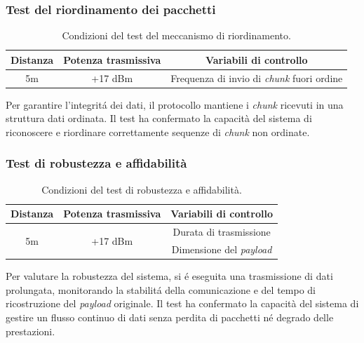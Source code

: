 \documentclass[12pt,a4paper,twoside]{book}
\begin{document}
\subsubsection{Test del riordinamento dei pacchetti}
\begin{table}[H]
    \centering
    \begin{tabular}{|c|c|c|}
        \hline
        \textbf{Distanza} & \textbf{Potenza trasmissiva} & \textbf{Variabili di controllo}                 \\ \hline
        5m                & +17 dBm                      & Frequenza di invio di \emph{chunk} fuori ordine \\ \hline
    \end{tabular}
    \caption{Condizioni del test del meccanismo di riordinamento.}
    \label{tab:T4-conditions}
\end{table}
Per garantire l'integrit\'a dei dati, il protocollo mantiene i \emph{chunk} ricevuti
in una struttura dati ordinata.
Il test ha confermato la capacità del sistema di riconoscere e riordinare
correttamente sequenze di \emph{chunk} non ordinate.

\subsubsection{Test di robustezza e affidabilità}
\begin{table}[H]
    \centering
    \begin{tabular}{|c|c|c|}
        \hline
        \textbf{Distanza}   & \textbf{Potenza trasmissiva} & \textbf{Variabili di controllo} \\ \hline
        \multirow{2}{*}{5m} & \multirow{2}{*}{+17 dBm}     & Durata di trasmissione          \\ \cline{3-3}
                            &                              & Dimensione del \emph{payload}   \\ \hline
    \end{tabular}
    \caption{Condizioni del test di robustezza e affidabilità.}
    \label{tab:T5-conditions}
\end{table}
Per valutare la robustezza del sistema, si \'e eseguita una trasmissione di dati
prolungata, monitorando la stabilit\'a della comunicazione e del tempo di ricostruzione
del \emph{payload} originale.
Il test ha confermato la capacità del sistema di gestire un flusso continuo di dati
senza perdita di pacchetti né degrado delle prestazioni.
\end{document}
